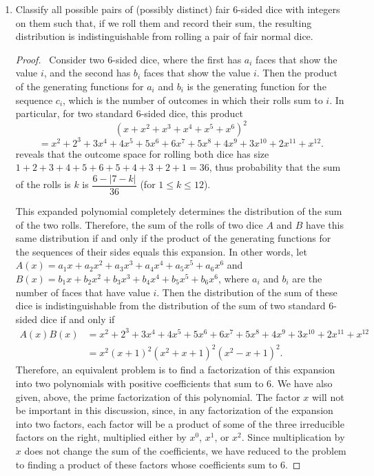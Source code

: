 \documentclass[12pt]{article}
\begin{document}
\begin{enumerate}[leftmargin=0cm,itemindent=.5cm,labelwidth=\itemindent,labelsep=0cm,align=left]
\item Classify all possible pairs of (possibly distinct) fair $6$-sided dice with integers on them such that, if we roll them and record their sum, the resulting distribution is indistinguishable from rolling a pair of fair normal dice.

\begin{proof}

\ Consider two $6$-sided dice, where the first has $a_i$ faces that show the value $i$, and the second has $b_i$ faces that show the value $i$.  Then the product of the generating functions for $a_i$ and $b_i$ is the generating function for the sequence $c_i$, which is the number of outcomes in which their rolls sum to $i$.
In particular, for two standard $6$-sided dice, this product
$$
(x + x^2 + x^3 + x^4 + x^5 + x^6)^2
$$
$$
=x^2 + 2^3 + 3x^4 + 4x^5 + 5x^6 + 6x^7 + 5x^8 + 4x^9 + 3x^{10} + 2x^{11} + x^{12}.
$$
reveals that the outcome space for rolling both dice has size $1 + 2 + 3 + 4 + 5 + 6 + 5 + 4 + 3 + 2 + 1 = 36$, thus probability that the sum of the rolls is $k$ is $\dfrac{6 - |7 - k|}{36}$ (for $1 \leq k \leq 12$).

This expanded polynomial completely determines the distribution of the sum of the two rolls.  Therefore, the sum of the rolls of two dice $A$ and $B$ have this same distribution if and only if the product of the generating functions for the sequences of their sides equals this expansion.  In other words, let $A(x) = a_1x + a_2x^2 + a_3x^3 + a_4x^4 + a_5x^5 + a_6x^6$ and $B(x) = b_1x + b_2x^2 + b_3x^3 + b_4x^4 + b_5x^5 + b_6x^6$, where $a_i$ and $b_i$ are the number of faces that have value $i$.  Then the distribution of the sum of these dice is indistinguishable from the distribution of the sum of two standard $6$-sided dice if and only if
\begin{align*}
A(x)B(x) &= x^2 + 2^3 + 3x^4 + 4x^5 + 5x^6 + 6x^7 + 5x^8 + 4x^9 + 3x^{10} + 2x^{11} + x^{12}
\\
&=x^2(x+1)^2(x^2+x+1)^2(x^2-x+1)^2.
\end{align*}
Therefore, an equivalent problem is to find a factorization of this expansion into two polynomials with positive coefficients that sum to $6$.  We have also given, above, the prime factorization of this polynomial.  The factor $x$ will not be important in this discussion, since, in any factorization of the expansion into two factors, each factor will be a product of some of the three irreducible factors on the right, multiplied either by $x^0$, $x^1$, or $x^2$.  Since multiplication by $x$ does not change the sum of the coefficients, we have reduced to the problem to finding a product of these factors whose coefficients sum to $6$.


\end{proof}
\end{enumerate}
\end{document}
